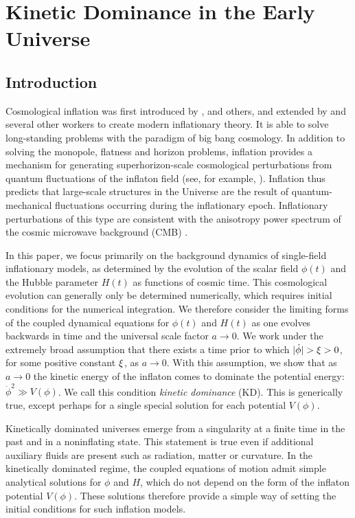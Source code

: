 \chapter{Kinetic Dominance in the Early Universe}
\label{chap:kd}

\section{Introduction}

Cosmological inflation was first introduced by
\citet{starobinskii_spectrum_1979}, \citet{guth_inflationary_1981} and
others, and extended by \citet{linde_1982} and several other workers
to create modern inflationary theory. It is able to solve
long-standing problems with the paradigm of big bang cosmology. In
addition to solving the monopole, flatness and horizon problems,
inflation provides a mechanism for generating superhorizon-scale
cosmological perturbations from quantum fluctuations of the inflaton
field (see, for example, \citet{mukhanov_theory_1992}). Inflation thus
predicts that large-scale structures in the Universe are the result of
quantum-mechanical fluctuations occurring during the inflationary
epoch. Inflationary perturbations of this type are consistent with the
anisotropy power spectrum of the cosmic microwave background (CMB)
\citep{hinshaw_nine-year_2012,planck_collaboration_planck_2013}.

In this paper, we focus primarily on the background dynamics of single-field inflationary models, as determined by the evolution of the scalar field $\phi(t)$ and the Hubble parameter $H(t)$ as functions of cosmic time.  This cosmological evolution can generally only be determined numerically, which requires initial conditions for the numerical integration.  We therefore consider the limiting forms of the coupled dynamical equations for $\phi(t)$ and $H(t)$ as one evolves backwards in time and the universal scale factor $a\to 0$. We work under the extremely broad assumption that there exists a time prior to which $|\dot{\phi}| > \xi > 0$, for some positive constant $\xi$, as $a \to 0$.  With this assumption, we show that as $a\to 0$ the kinetic energy of the inflaton comes to dominate the potential energy: $\dot{\phi}^2\gg V(\phi)$. We call this condition {\em kinetic dominance\/} (KD). This is generically true, except perhaps for a single special solution for each potential $V(\phi)$.

Kinetically dominated universes emerge from a singularity at a finite time in the past and in a noninflating state. This statement is true even if additional auxiliary fluids are present such as radiation, matter or curvature.  In the kinetically dominated regime, the coupled equations of motion admit simple analytical solutions for $\phi$ and $H$, which do not depend on the form of the inflaton potential $V(\phi)$.  These solutions therefore provide a simple way of setting the initial conditions for such inflation models.


